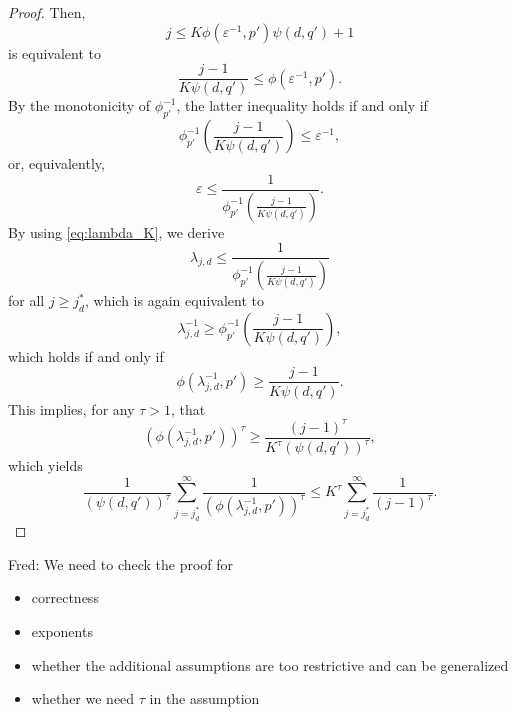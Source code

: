 \documentclass{article}
\theoremstyle{definition}
\newcommand{\fred}[1]{\begingroup\color{blue}Fred: #1\endgroup}
\begin{document}
\begin{proof}
Then, 
\[
j \le K \phi(\varepsilon^{-1},p')\psi(d,q') +1
\]
is equivalent to
\[
\frac{j-1}{K \psi(d,q')} \le \phi(\varepsilon^{-1},p').
\]
By the monotonicity of $\phi_{p'}^{-1}$, the latter inequality holds if and only if
\[
  \phi_{p'}^{-1} \left(\frac{j-1}{K \psi(d,q')} \right)
  \le \varepsilon^{-1},
\]
or, equivalently,
\[
 \varepsilon \le \frac{1}{\phi_{p'}^{-1} \left(\frac{j-1}{K \psi(d,q')} \right)}.
\]
By using \eqref{eq:lambda_K}, we derive
\[
 \lambda_{j,d}\le \frac{1}{\phi_{p'}^{-1} \left(\frac{j-1}{K \psi(d,q')} \right)}
\]
for all $j\ge j_d^*$, which is again equivalent to 
\[
\lambda_{j,d}^{-1}\ge \phi_{p'}^{-1} \left(\frac{j-1}{K \psi(d,q')} \right),
\]
which holds if and only if
\[ 
 \phi (\lambda_{j,d}^{-1}, p') \ge \frac{j-1}{K \psi(d,q')}.
\]
This implies, for any $\tau>1$, that 
\[ 
 (\phi (\lambda_{j,d}^{-1}, p'))^\tau \ge \frac{(j-1)^\tau}{K^\tau (\psi(d,q'))^\tau},
\]
which yields
\[
\frac{1}{(\psi(d,q'))^\tau} \sum_{j=j_d^*}^\infty \frac{1}{(\phi (\lambda_{j,d}^{-1}, p'))^\tau} \le K^\tau \sum_{j=j_d^*}^\infty \frac{1}{(j-1)^\tau}.
\]

\end{proof}

\bigskip


\bigskip

\fred{We need to check the proof for 
\begin{itemize}
\item correctness
\item exponents
\item whether the additional assumptions are too restrictive and can be generalized
\item whether we need $\tau$ in the assumption
\end{itemize}}
\end{document}
